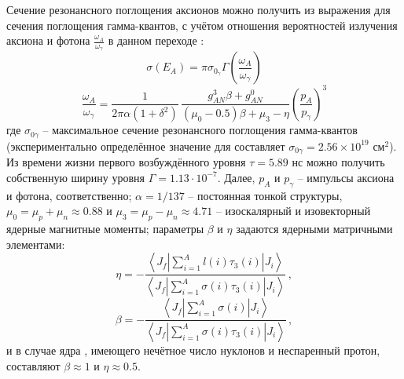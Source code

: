 \documentclass[a4paper,article,14pt]{extarticle}
\begin{document}
Сечение резонансного поглощения аксионов можно получить из выражения для сечения поглощения гамма-квантов, с учётом отношения вероятностей излучения аксиона и фотона $\frac{\omega_A}{\omega _{\gamma}}$ в данном переходе \cite{donnelly1978axions}:
\begin{equation}\label{eq:sech}
    \sigma(E_A) =
    \pi \sigma_{0_\gamma} \Gamma
    \left(
    \frac{\omega _A}{\omega _\gamma}
    \right)
\end{equation}
\begin{equation}\label{eq:wAwy}
    \frac{\omega_A}{\omega_\gamma} =
    \frac{1}{2 \pi \alpha (1 + \delta^2)}\,
    \frac{g_{AN}^3 \beta + g_{AN}^0}{(\mu_0 - 0.5)\beta + \mu_3 - \eta}
    \left(
    {\frac{{{p_A}}}{{{p _\gamma }}}}
    \right)^3
\end{equation}
где  $\sigma_{0\gamma}$ -- максимальное сечение резонансного поглощения гамма-квантов (экспериментально определённое значение для {\Tm} составляет $\sigma_{0\gamma} = 2.56 \times 10^{19} \text{ см}^2$).
Из времени жизни первого возбуждённого уровня $\tau = 5.89 \text{ нс}$ можно получить собственную ширину уровня $\Gamma = 1.13 \cdot 10^{-7}$.
Далее, $p_A$ и $p_{\gamma}$ -- импульсы аксиона и фотона, соответственно; $\alpha = 1/137$ -- постоянная тонкой структуры, $\mu_0 = \mu_p + \mu_n \approx 0.88$ и $\mu_3 = \mu_p - \mu_n \approx 4.71$ -- изоскалярный и изовекторный ядерные магнитные моменты; параметры $\beta$ и $\eta$ задаются ядерными матричными элементами:
\begin{equation}
    \eta =
    - \frac{
    \left\langle
    J_f
    \left|
    \sum\limits_{i = 1}^A {l(i){\tau_3}(i)}
    \right|
    J_i
    \right\rangle
    }
    {
    \left\langle
    J_f
    \left|
    \sum\limits_{i = 1}^A {\sigma (i){\tau _3}(i)}
    \right|
    J_i
    \right\rangle
    }\, ,
\end{equation}
\begin{equation}
    \beta =
    - \frac{
        \left\langle
        J_f
        \left|
        \sum\limits_{i = 1}^A \sigma (i)
        \right|
        J_i
        \right\rangle
    }
    {
        \left\langle
        J_f
        \left|
        \sum\limits_{i = 1}^A \sigma (i){\tau _3}(i)
        \right|
        J_i
        \right\rangle
    }\, ,
\end{equation}
и в случае ядра {\Tm}, имеющего нечётное число нуклонов и неспаренный протон, составляют $\beta \approx 1$ и $\eta \approx 0.5$.
\end{document}
